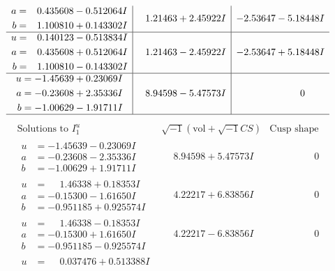 \documentclass[1p]{elsarticle_modified}
\theoremstyle{definition}
\newcommand{\I}{\sqrt{-1}}
\begin{document}
$$\begin{array}{c|c|c}
\begin{aligned}
a &= \phantom{-}0.435608 - 0.512064 I \\
b &= \phantom{-}1.100810 + 0.143302 I\end{aligned}
 & \phantom{-}1.21463 + 2.45922 I & -2.53647 - 5.18448 I \\ \hline\begin{aligned}
u &= \phantom{-}0.140123 - 0.513834 I \\
a &= \phantom{-}0.435608 + 0.512064 I \\
b &= \phantom{-}1.100810 - 0.143302 I\end{aligned}
 & \phantom{-}1.21463 - 2.45922 I & -2.53647 + 5.18448 I \\ \hline\begin{aligned}
u &= -1.45639 + 0.23069 I \\
a &= -0.23608 + 2.35336 I \\
b &= -1.00629 - 1.91711 I\end{aligned}
 & \phantom{-}8.94598 - 5.47573 I & \phantom{-0.000000 } 0\\
 \hline 
 \end{array}$$\newpage$$\begin{array}{c|c|c}  
\text{Solutions to }I^u_{1}& \I (\text{vol} + \sqrt{-1}CS) & \text{Cusp shape}\\
 \hline 
\begin{aligned}
u &= -1.45639 - 0.23069 I \\
a &= -0.23608 - 2.35336 I \\
b &= -1.00629 + 1.91711 I\end{aligned}
 & \phantom{-}8.94598 + 5.47573 I & \phantom{-0.000000 } 0 \\ \hline\begin{aligned}
u &= \phantom{-}1.46338 + 0.18353 I \\
a &= -0.15300 - 1.61650 I \\
b &= -0.951185 + 0.925574 I\end{aligned}
 & \phantom{-}4.22217 + 6.83856 I & \phantom{-0.000000 } 0 \\ \hline\begin{aligned}
u &= \phantom{-}1.46338 - 0.18353 I \\
a &= -0.15300 + 1.61650 I \\
b &= -0.951185 - 0.925574 I\end{aligned}
 & \phantom{-}4.22217 - 6.83856 I & \phantom{-0.000000 } 0 \\ \hline\begin{aligned}
u &= \phantom{-}0.037476 + 0.513388 I \\

\end{aligned}
\end{array}$$
\end{document}
